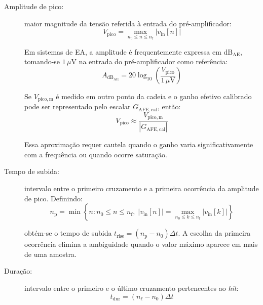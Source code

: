 \begin{description}
	\item[Amplitude de pico:] maior magnitude da tensão referida à entrada do pré-amplificador:
	\begin{equation}
		V_{\mathrm{pico}} = \max_{n_0\leq n\leq n_{\mathrm{f}}} \left| v_{\mathrm{in}}[n] \right|
		\label{v2:eq:amplitude_pico}
	\end{equation}
	
	Em sistemas de EA, a amplitude é frequentemente expressa em \(\mathrm{dB}_{\mathrm{AE}}\), tomando-se \(1\,\mu\mathrm{V}\) na entrada do pré-amplificador como referência:
	\begin{equation}
		A_{\mathrm{dB}_{\mathrm{AE}}} = 20\log_{10} \left(\frac{V_{\mathrm{pico}}}{1\,\mu\mathrm{V}} \right)
		\label{v2:eq:amplitude_dbae}
	\end{equation}
	
	Se \(V_{\mathrm{pico,m}}\) é medido em outro ponto da cadeia e o ganho efetivo calibrado pode ser representado pelo escalar \(G_{\mathrm{AFE,cal}}\), então:
	\begin{equation}
		V_{\mathrm{pico}} \approx \frac{V_{\mathrm{pico,m}}} {\left|G_{\mathrm{AFE,cal}}\right|}
		\label{v2:eq:amplitude_referida_entrada}
	\end{equation}
	
	Essa aproximação requer cautela quando o ganho varia significativamente com a frequência ou quando ocorre saturação.
	
	\item[Tempo de subida:] intervalo entre o primeiro cruzamento e a primeira ocorrência da amplitude de pico. Definindo:
	\begin{equation}
		n_{\mathrm{p}} = \min \left\{ n: n_0\leq n\leq n_{\mathrm{f}}, \; \left|v_{\mathrm{in}}[n]\right| = \max_{n_0\leq k\leq n_{\mathrm{f}}} |v_{\mathrm{in}}[k]| \right\}
		\label{v2:eq:indice_primeiro_pico}
	\end{equation}
	
	\noindent
	obtém-se o tempo de subida \(t_{\mathrm{rise}} = \left(n_{\mathrm{p}}-n_0 \right)\Delta t\). A escolha da primeira ocorrência elimina a ambiguidade quando o valor máximo aparece em mais de uma amostra.
	
	\item[Duração:] intervalo entre o primeiro e o último cruzamento pertencentes ao \textit{hit}:
	\begin{equation}
		t_{\mathrm{dur}} = \left(n_{\ell}-n_0 \right)\Delta t
		\label{v2:eq:duracao_hit}
	\end{equation}
	

\end{description}

